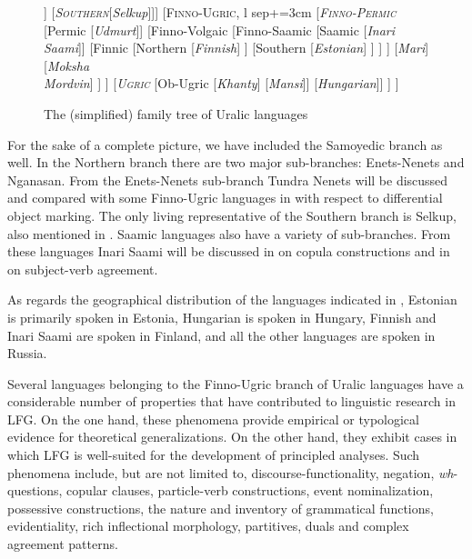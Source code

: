 \documentclass[output=paper,hidelinks]{langscibook}
\begin{document}
  
\begin{figure}[t]
  \begin{forest} %
    [URALIC\\
        [\textsc{Samoyedic}
          [\textsl{\textsc{Northern}}[\textit{Tundra}\\\textit{Nenets}]]
          [\textsl{\textsc{Southern}}[\textit{Selkup}]]]
        [\textsc{Finno-Ugric}, l sep+=3cm
          [\textsl{\textsc{Finno-Permic}}
            [Permic [\textit{Udmurt}]]
            [Finno-Volgaic
              [Finno-Saamic
                [Saamic [\textit{Inari}\\\textit{Saami}]]
                [Finnic [Northern [\textit{Finnish}]
                ]
                        [Southern [\textit{Estonian}]
                        ]
                ]
               ]
               [\textit{Mari}]
               [\textit{Moksha}\\\textit{Mordvin}]
            ]
          ]
          [\textsl{\textsc{Ugric}}
                [Ob-Ugric
                        [\textit{Khanty}]
                        [\textit{Mansi}]]
                        [\textit{Hungarian}]]
                        ]
                        ]
  \end{forest}
\caption{The (simplified) family tree of Uralic languages}
\label{fig:FinnoUgric:1}
\end{figure}

For the sake of a complete picture, we have included the Samoyedic branch as well. In the Northern branch there are two major sub-branches: Enets-Nenets and Nganasan. From the Enets-Nenets sub-branch Tundra Nenets will be discussed and compared with some Finno-Ugric languages in  with respect to differential object marking. The only living representative of the Southern branch is Selkup, also mentioned in . Saamic languages also have a variety of sub-branches. From these languages Inari Saami will be discussed in  on copula constructions and in  on subject-verb agreement.

As regards the geographical distribution of the languages indicated in , Estonian is primarily spoken in Estonia, Hungarian is spoken in Hungary, Finnish and Inari Saami are spoken in Finland, and all the other languages are spoken in Russia.

Several languages belonging to the Finno-Ugric branch of Uralic languages have a considerable number of properties that have contributed to linguistic research in LFG. On the one hand, these phenomena provide empirical or typological evidence for theoretical generalizations. On the other hand, they exhibit cases in which LFG is well-suited for the development of principled analyses. Such phenomena include, but are not limited to, discourse-functionality, negation, \textit{wh}-questions, copular clauses, particle-verb constructions, event nominalization, possessive constructions, the nature and inventory of grammatical functions, evidentiality, rich inflectional morphology, partitives, duals and complex agreement patterns.
\end{document}
